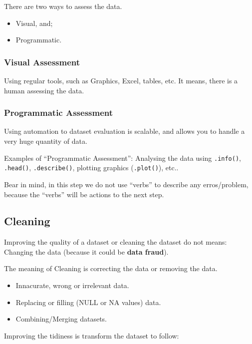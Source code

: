 \documentclass[]{book}
\providecommand{\tightlist}{%
  \setlength{\itemsep}{0pt}\setlength{\parskip}{0pt}}
\begin{document}
There are two ways to assess the data.

\begin{itemize}
\tightlist
\item
  Visual, and;
\item
  Programmatic.
\end{itemize}

\subsubsection{Visual Assessment}\label{visual-assessment}

Using regular tools, such as Graphics, Excel, tables, etc. It means,
there is a human assessing the data.

\subsubsection{Programmatic Assessment}\label{programmatic-assessment}

Using automation to dataset evaluation is scalable, and allows you to
handle a very huge quantity of data.

Examples of ``Programmatic Assessment'': Analysing the data using
\texttt{.info()}, \texttt{.head()}, \texttt{.describe()}, plotting
graphics (\texttt{.plot()}), etc..

Bear in mind, in this step we do not use ``verbs'' to describe any
erros/problem, because the ``verbs'' will be actions to the next step.

\subsection{Cleaning}\label{cleaning}

Improving the quality of a dataset or cleaning the dataset do not means:
Changing the data (because it could be \textbf{data fraud}).

The meaning of Cleaning is correcting the data or removing the data.

\begin{itemize}
\tightlist
\item
  Innacurate, wrong or irrelevant data.
\item
  Replacing or filling (NULL or NA values) data.
\item
  Combining/Merging datasets.
\end{itemize}

Improving the tidiness is transform the dataset to follow:
\end{document}
